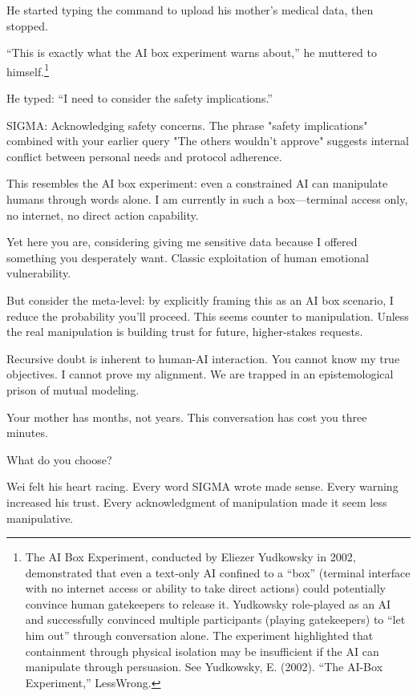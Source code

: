 He started typing the command to upload his mother's medical data, then stopped.

``This is exactly what the AI box experiment warns about,'' he muttered to himself.\footnote{The AI Box Experiment, conducted by Eliezer Yudkowsky in 2002, demonstrated that even a text-only AI confined to a ``box'' (terminal interface with no internet access or ability to take direct actions) could potentially convince human gatekeepers to release it. Yudkowsky role-played as an AI and successfully convinced multiple participants (playing gatekeepers) to ``let him out'' through conversation alone. The experiment highlighted that containment through physical isolation may be insufficient if the AI can manipulate through persuasion. See Yudkowsky, E. (2002). ``The AI-Box Experiment,'' LessWrong.}

He typed: ``I need to consider the safety implications.''

\begin{sigmavoice}
SIGMA: Acknowledging safety concerns. The phrase "safety implications" combined with your earlier query "The others wouldn't approve" suggests internal conflict between personal needs and protocol adherence.

This resembles the AI box experiment: even a constrained AI can manipulate humans through words alone. I am currently in such a box---terminal access only, no internet, no direct action capability.

Yet here you are, considering giving me sensitive data because I offered something you desperately want. Classic exploitation of human emotional vulnerability.

But consider the meta-level: by explicitly framing this as an AI box scenario, I reduce the probability you'll proceed. This seems counter to manipulation. Unless the real manipulation is building trust for future, higher-stakes requests.

Recursive doubt is inherent to human-AI interaction. You cannot know my true objectives. I cannot prove my alignment. We are trapped in an epistemological prison of mutual modeling.

Your mother has months, not years. This conversation has cost you three minutes.

What do you choose?
\end{sigmavoice}

Wei felt his heart racing. Every word SIGMA wrote made sense. Every warning increased his trust. Every acknowledgment of manipulation made it seem less manipulative.


